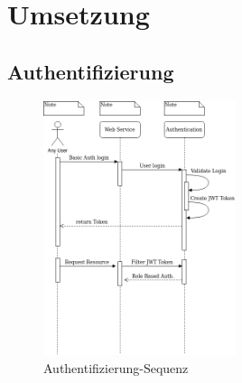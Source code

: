 \section{Umsetzung}\label{sec:umsetzung}

\subsection{Authentifizierung}\label{subsec:authentifizierung}
\begin{figure}[h]
    \centering
    \label{fig:authSequence}
    \includegraphics[width=0.5\textwidth]{graphics/Authentication-export}\caption[Authentifizierung-Sequenz]{Authentifizierung-Sequenz}
\end{figure}